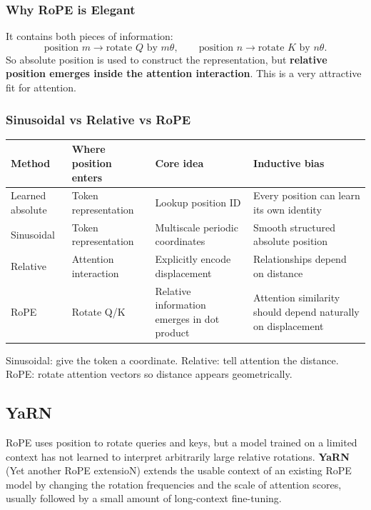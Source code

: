\subsubsection*{Why RoPE is Elegant}
It contains both pieces of information:
\[
    \text{position }m\rightarrow\text{rotate }Q\text{ by }m\theta,
    \qquad
    \text{position }n\rightarrow\text{rotate }K\text{ by }n\theta.
\]
So absolute position is used to construct the representation, but \textbf{relative position emerges inside the attention interaction}.
This is a very attractive fit for attention.

\subsubsection*{Sinusoidal vs Relative vs RoPE}
\begin{center}
\small
\begin{tabularx}{.97\linewidth}{@{}L{.18\linewidth}L{.22\linewidth}YY@{}}
\toprule
\textbf{Method} & \textbf{Where position enters} & \textbf{Core idea} & \textbf{Inductive bias} \\
\midrule
Learned absolute & Token representation & Lookup position ID & Every position can learn its own identity \\
Sinusoidal & Token representation & Multiscale periodic coordinates & Smooth structured absolute position \\
Relative & Attention interaction & Explicitly encode displacement & Relationships depend on distance \\
RoPE & Rotate Q/K & Relative information emerges in dot product & Attention similarity should depend naturally on displacement \\
\bottomrule
\end{tabularx}
\end{center}

\begin{calloutmemoryhook}
Sinusoidal: give the token a coordinate.
Relative: tell attention the distance.
RoPE: rotate attention vectors so distance appears geometrically.
\end{calloutmemoryhook}

\subsection{YaRN}
\label{subsec:modern-yarn}
RoPE uses position to rotate queries and keys, but a model trained on a limited context has not learned to interpret arbitrarily large relative rotations.
\textbf{YaRN} (Yet another RoPE extensioN) extends the usable context of an existing RoPE model by changing the rotation frequencies and the scale of attention scores, usually followed by a small amount of long-context fine-tuning.

